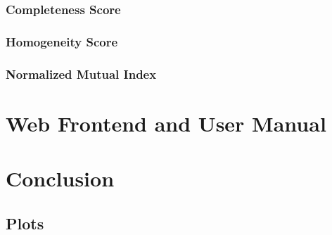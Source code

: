 \documentclass[12pt, english]
{article}
\begin{document}
\subsubsection{Completeness Score}

\subsubsection{Homogeneity Score}

\subsubsection{Normalized Mutual Index}



\section{Web Frontend and User Manual}


\section{Conclusion}


\newpage

\printglossary[style=altlist,title=Glossary]
 
\printglossary[type=\acronymtype,style=long]
 
\printglossary[type=symbolslist,style=long]

\newpage




\nocite{*}

\begin{appendices}
	\section{Plots}
	
\end{appendices}
\end{document}

